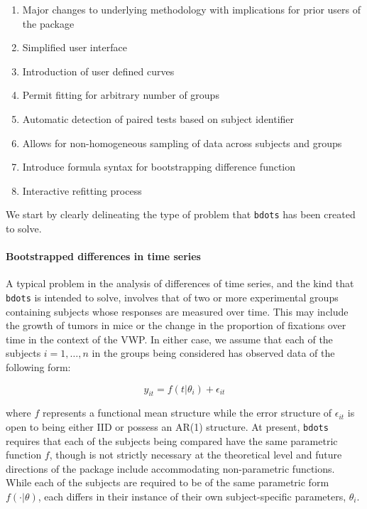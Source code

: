 \documentclass{article}
\newcommand{\xt}{\texttt}%
\begin{document}
\begin{singlespace}
\begin{enumerate}
\item Major changes to underlying methodology with implications for prior users of the package
\item Simplified user interface
\item Introduction of user defined curves
\item Permit fitting for arbitrary number of groups
\item Automatic detection of paired tests based on subject identifier
\item Allows for non-homogeneous sampling of data across subjects and groups
\item Introduce formula syntax for bootstrapping difference function
\item Interactive refitting process
\end{enumerate}
\end{singlespace}


We start by clearly delineating the type of problem that \xt{bdots} has been created to solve.

\paragraph{Bootstrapped differences in time series}

A typical problem in the analysis of differences of time series, and the kind that \xt{bdots} is intended to solve, involves that of two or more experimental groups containing subjects whose responses are measured over time. This may include the growth of tumors in  mice or the change in the proportion of fixations over time in the context of the VWP. In either case, we assume that each of the subjects $i = 1, \dots, n$ in the groups being considered has observed data of the following form:

\begin{equation}\label{eq:mean_structure}
y_{it} = f(t | \theta_i) + \epsilon_{it} 
\end{equation}


where $f$ represents a functional mean structure while the error structure of $\epsilon_{it}$ is open to being either IID or possess an AR(1) structure. At present, \xt{bdots} requires that each of the subjects being compared have the same parametric function $f$, though is not strictly necessary at the theoretical level and future directions of the package include accommodating non-parametric functions. While each of the subjects are required to be of the same parametric form $f(\cdot | \theta)$, each differs in their instance of their own subject-specific parameters, $\theta_i$.
\end{document}
